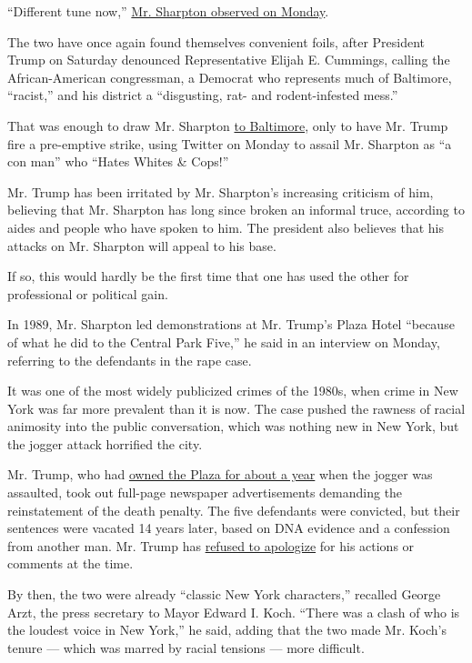 ``Different tune now,''
\href{https://twitter.com/thereval/status/1155793807797043201?s=21}{Mr.
Sharpton observed on Monday}.

The two have once again found themselves convenient foils, after
President Trump on Saturday denounced Representative Elijah E. Cummings,
calling the African-American congressman, a Democrat who represents much
of Baltimore, ``racist,'' and his district a ``disgusting, rat- and
rodent-infested mess.''

That was enough to draw Mr. Sharpton
\href{https://www.nytimes.com/2019/07/28/us/trump-baltimore.html}{to
Baltimore}, only to have Mr. Trump fire a pre-emptive strike, using
Twitter on Monday to assail Mr. Sharpton as ``a con man'' who ``Hates
Whites \& Cops!''

Mr. Trump has been irritated by Mr. Sharpton's increasing criticism of
him, believing that Mr. Sharpton has long since broken an informal
truce, according to aides and people who have spoken to him. The
president also believes that his attacks on Mr. Sharpton will appeal to
his base.

If so, this would hardly be the first time that one has used the other
for professional or political gain.

In 1989, Mr. Sharpton led demonstrations at Mr. Trump's Plaza Hotel
``because of what he did to the Central Park Five,'' he said in an
interview on Monday, referring to the defendants in the rape case.

It was one of the most widely publicized crimes of the 1980s, when crime
in New York was far more prevalent than it is now. The case pushed the
rawness of racial animosity into the public conversation, which was
nothing new in New York, but the jogger attack horrified the city.

Mr. Trump, who had
\href{https://www.nytimes.com/1988/03/27/nyregion/plaza-hotel-is-sold-to-donald-trump-for-390-million.html}{owned
the Plaza for about a year} when the jogger was assaulted, took out
full-page newspaper advertisements demanding the reinstatement of the
death penalty. The five defendants were convicted, but their sentences
were vacated 14 years later, based on DNA evidence and a confession from
another man. Mr. Trump has
\href{https://www.nytimes.com/2019/06/18/nyregion/central-park-five-trump.html}{refused
to apologize} for his actions or comments at the time.

By then, the two were already ``classic New York characters,'' recalled
George Arzt, the press secretary to Mayor Edward I. Koch. ``There was a
clash of who is the loudest voice in New York,'' he said, adding that
the two made Mr. Koch's tenure --- which was marred by racial tensions
--- more difficult.

